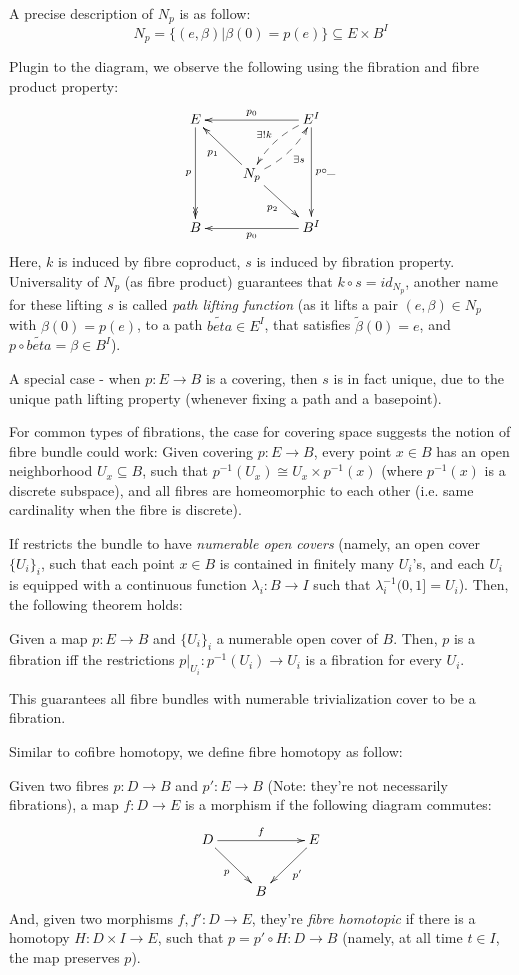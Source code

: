 \documentclass{article}
\begin{document}
A precise description of $N_p$ is as follow:
\[N_p = \{(e,\beta) | \beta(0)=p(e)\} \subseteq E\times B^I\]  

Plugin to the diagram, we observe the following using the fibration and fibre product property:
\[\xymatrix{
    E \ar@{->>}[dd]_-{p} && E^I \ar@{-->}@/_{.5pc}/[dl]_-{\exists ! k} \ar[ll]_-{p_0} \ar[dd]^-{p\circ \_}\\
    & N_p \ar[ul]^-{p_1} \ar[dr]_-{p_2} \ar@{-->}@/_{.5pc}/[ur]_-{\exists s}\\
    B && B^I \ar[ll]^-{p_0}
}\]
Here, $k$ is induced by fibre coproduct, $s$ is induced by fibration property. Universality of $N_p$ (as fibre product) guarantees that $k\circ s = id_{N_p}$, another name for these lifting $s$ is called \emph{path lifting function} (as it lifts a pair $(e,\beta)\in N_p$ with $\beta(0)=p(e)$, to a path $\tilde{beta}\in E^I$, that satisfies $\tilde{\beta}(0)=e$, and $p\circ \tilde{beta}=\beta\in B^I$).

A special case - when $p:E\rightarrow B$ is a covering, then $s$ is in fact unique, due to the unique path lifting property (whenever fixing a path and a basepoint). 

\hfil

For common types of fibrations, the case for covering space suggests the notion of fibre bundle could work: Given covering $p:E\rightarrow B$, every point $x\in B$ has an open neighborhood $U_x\subseteq B$, such that $p^{-1}(U_x)\cong U_x\times p^{-1}(x)$ (where $p^{-1}(x)$ is a discrete subspace), and all fibres are homeomorphic to each other (i.e. same cardinality when the fibre is discrete).

If restricts the bundle to have \emph{numerable open covers} (namely, an open cover $\{U_i\}_i$, such that each point $x\in B$ is contained in finitely many $U_i$'s, and each $U_i$ is equipped with a continuous function $\lambda_i:B\rightarrow I$ such that $\lambda_i^{-1}(0,1] = U_i$). Then, the following theorem holds:
\begin{thm}
Given a map $p:E\rightarrow B$ and $\{U_i\}_i$ a numerable open cover of $B$. Then, $p$ is a fibration iff the restrictions $p|_{U_i}:p^{-1}(U_i)\rightarrow U_i$ is a fibration for every $U_i$.
\end{thm}

This guarantees all fibre bundles with numerable trivialization cover to be a fibration.

\hfil

Similar to cofibre homotopy, we define fibre homotopy as follow:
\begin{defn}
    Given two fibres $p:D\rightarrow B$ and $p':E\rightarrow B$ (Note: they're not necessarily fibrations), a map $f:D\rightarrow E$ is a morphism if the following diagram commutes:
    \[\xymatrix{
        D \ar[dr]_-{p} \ar[rr]^-{f} && E \ar[dl]^-{p'}\\
        & B
    }\]
    And, given two morphisms $f,f':D\rightarrow E$, they're \emph{fibre homotopic} if there is a homotopy $H:D\times I\rightarrow E$, such that $p = p'\circ H:D\rightarrow B$ (namely, at all time $t\in I$, the map preserves $p$).
\end{defn}
\end{document}
